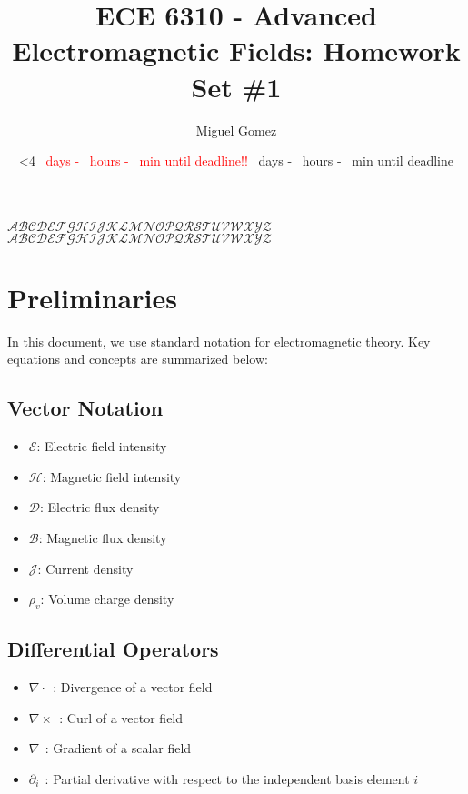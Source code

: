 \documentclass[12pt]{article}
\newcommand{\TimeUntilDue}{
  \ifnum\daystilldue<4
    \textcolor{red}{
    \number\daystilldue\ days - 
    \number\hourstilldue\ hours - 
    \number\minutestilldue\ min until deadline!!
  }
\else
    \number\daystilldue\ days - 
    \number\hourstilldue\ hours - 
    \number\minutestilldue\ min until deadline
  \fi
}
\begin{document}
\title{ECE 6310 - Advanced Electromagnetic Fields: Homework Set \#1}
\author{Miguel Gomez}
\date{\TimeUntilDue}
\maketitle

\begin{center}
  $\mathcal{ABCDEFGHIJKLMNOPQRSTUVWXYZ}$\\
$\mathscr{ABCDEFGHIJKLMNOPQRSTUVWXYZ}$
\end{center}
\section{Preliminaries}

In this document, we use standard notation for electromagnetic theory. Key equations and concepts are summarized below:

\subsection*{Vector Notation}
\begin{itemize}
  \item $\bm{\mathcal{E}}$: Electric field intensity
  \item $\bm{\mathcal{H}}$: Magnetic field intensity
  \item $\bm{\mathcal{D}}$: Electric flux density
  \item $\bm{\mathcal{B}}$: Magnetic flux density
  \item $\bm{\mathcal{J}}$: Current density
  \item $\rho_v$: Volume charge density
\end{itemize}

\subsection*{Differential Operators}
\begin{itemize}
  \item $\nabla \cdot\ \ $: Divergence of a vector field
  \item $\nabla \times\ \ $: Curl of a vector field
  \item $\nabla\ \ $: Gradient of a scalar field
  \item $\partial_i\ \ $: Partial derivative with respect to the independent basis element $i$
\end{itemize}
\end{document}
